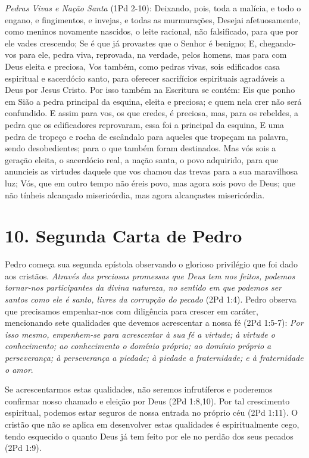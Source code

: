\documentclass[
]{book}
\begin{document}
\emph{Pedras Vivas e Nação Santa} (1Pd 2-10): Deixando, pois, toda a malícia, e todo o engano, e fingimentos, e invejas, e todas as murmurações, Desejai afetuosamente, como meninos novamente nascidos, o leite racional, não falsificado, para que por ele vades crescendo; Se é que já provastes que o Senhor é benigno; E, chegando-vos para ele, pedra viva, reprovada, na verdade, pelos homens, mas para com Deus eleita e preciosa, Vos também, como pedras vivas, sois edificados casa espiritual e sacerdócio santo, para oferecer sacrifícios espirituais agradáveis a Deus por Jesus Cristo. Por isso também na Escritura se contém: Eis que ponho em Sião a pedra principal da esquina, eleita e preciosa; e quem nela crer não será confundido. E assim para vos, os que credes, é preciosa, mas, para os rebeldes, a pedra que os edificadores reprovaram, essa foi a principal da esquina, E uma pedra de tropeço e rocha de escândalo para aqueles que tropeçam na palavra, sendo desobedientes; para o que também foram destinados. Mas vós sois a geração eleita, o sacerdócio real, a nação santa, o povo adquirido, para que anuncieis as virtudes daquele que vos chamou das trevas para a sua maravilhosa luz; Vós, que em outro tempo não éreis povo, mas agora sois povo de Deus; que não tínheis alcançado misericórdia, mas agora alcançastes misericórdia.

\hypertarget{segunda-carta-de-pedro}{%
\section*{10. Segunda Carta de Pedro}\label{segunda-carta-de-pedro}}

Pedro começa sua segunda epístola observando o glorioso privilégio que foi dado aos cristãos. \emph{Através das preciosas promessas que Deus tem nos feitos, podemos tornar-nos participantes da divina natureza, no sentido em que podemos ser santos como ele é santo, livres da corrupção do pecado} (2Pd 1:4). Pedro observa que precisamos empenhar-nos com diligência para crescer em caráter, mencionando sete qualidades que devemos acrescentar a nossa fé (2Pd 1:5-7): \emph{Por isso mesmo, empenhem-se para acrescentar à sua fé a virtude; à virtude o conhecimento; ao conhecimento o domínio próprio; ao domínio próprio a perseverança; à perseverança a piedade; à piedade a fraternidade; e à fraternidade o amor}.

Se acrescentarmos estas qualidades, não seremos infrutíferos e poderemos confirmar nosso chamado e eleição por Deus (2Pd 1:8,10). Por tal crescimento espiritual, podemos estar seguros de nossa entrada no próprio céu (2Pd 1:11). O cristão que não se aplica em desenvolver estas qualidades é espiritualmente cego, tendo esquecido o quanto Deus já tem feito por ele no perdão dos seus pecados (2Pd 1:9).
\end{document}
